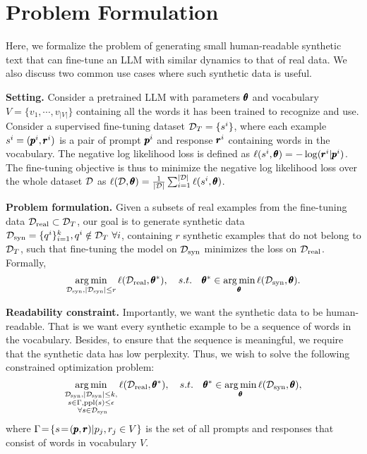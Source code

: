 \section{Problem Formulation}\label{sec: preliminary}
Here, we formalize the problem of generating small human-readable synthetic text that can fine-tune an LLM with similar dynamics to that of real data. We also discuss two common use cases where such synthetic data is useful.

%
\textbf{Setting.} Consider a pretrained LLM with parameters $\pmb{\theta}$ and vocabulary $V=\{v_1,\cdots,v_{|V|}\}$ containing all the words it has been trained to recognize and use. Consider a supervised fine-tuning dataset ${\mathcal{D}}_T = \{ s^i \}$, where each example $s^i = (\pmb{p}^i, \pmb{r}^i)$ is a pair of prompt $\pmb{p}^i$ and response $\pmb{r}^i$ containing words in the vocabulary. The negative log likelihood loss is defined as $\ell(s^i, \pmb{\theta}) = - \log (\pmb{r}^i | \pmb{p}^i)$. The fine-tuning objective is thus to minimize the negative log likelihood loss over the whole dataset ${\mathcal{D}}$ as $\ell({\mathcal{D}}, \pmb{\theta}) = \frac{1}{|{\mathcal{D}}|} \sum_{i=1}^{|{\mathcal{D}}|} \ell(s^i, \pmb{\theta})$.


\textbf{Problem formulation.} 
%
%
Given a subsets of real examples from the fine-tuning data ${\mathcal{D}}_\text{real}\subset{\mathcal{D}}_T$, our goal is to generate synthetic data ${\mathcal{D}}_\text{syn}=\{q^i\}_{i=1}^k, q^i\notin {\mathcal{D}}_T ~\forall i$, containing $r$ synthetic examples that do not belong to ${\mathcal{D}}_T$, such that fine-tuning the model on ${\mathcal{D}}_\text{syn}$ minimizes the loss on ${\mathcal{D}}_\text{real}$.
%
Formally,
%
\begin{equation}\label{eq:problem}
    \operatorname*{arg\,min}_{{\mathcal{D}}_\text{syn}, |{\mathcal{D}}_\text{syn}|\leq r} \ell({\mathcal{D}}_\text{real},\pmb{\theta}^*), \quad s.t. \quad \pmb{\theta}^*\in\operatorname*{arg\,min}_{\pmb{\theta}} \ell({\mathcal{D}}_\text{syn},\pmb{\theta}).
\end{equation}

%
\textbf{Readability constraint.} Importantly, we want the synthetic data to be human-readable. That is we want every synthetic example to be a sequence of %
words in the vocabulary. Besides, to ensure that the sequence is meaningful, we require that the synthetic data has low perplexity.
Thus, we wish to solve the following constrained optimization problem:
%
\begin{equation}\label{eq:problem_with_constraint}
    \operatorname*{arg\,min}_{\substack{{\mathcal{D}}_\text{syn}, |{\mathcal{D}}_\text{syn}|\leq k, \\ s \in \Gamma, \text{ppl}(s) \leq \epsilon \\~\forall s\in {\mathcal{D}}_\text{syn}}} \ell({\mathcal{D}}_\text{real},\pmb{\theta}^*), \quad s.t. \quad \pmb{\theta}^*\in\operatorname*{arg\,min}_{\pmb{\theta}} \ell({\mathcal{D}}_\text{syn},\pmb{\theta}),
\end{equation}
where $\Gamma \!=\! \{s\!=\!(\pmb{p},\pmb{r})|p_j, r_j\in V\}$ is the set of all prompts and responses that consist of words in vocabulary $V$. %

